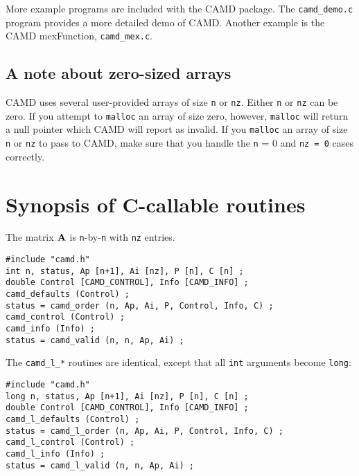 \documentclass[11pt]{article}
\newcommand{\m}[1]{{\bf{#1}}}       %
\begin{document}
More example programs are included with the CAMD package.
The {\tt camd\_demo.c} program provides a more detailed demo of CAMD.
Another example is the CAMD mexFunction, {\tt camd\_mex.c}.

\subsection{A note about zero-sized arrays}

CAMD uses several user-provided arrays of size {\tt n} or {\tt nz}.
Either {\tt n} or {\tt nz} can be zero.
If you attempt to {\tt malloc} an array of size zero,
however, {\tt malloc} will return a null pointer which CAMD will report
as invalid.  If you {\tt malloc} an array of
size {\tt n} or {\tt nz} to pass to CAMD, make sure that you handle the
{\tt n} = 0 and {\tt nz = 0} cases correctly.

\section{Synopsis of C-callable routines}
\label{Synopsis}

The matrix $\m{A}$ is {\tt n}-by-{\tt n} with {\tt nz} entries.

{\footnotesize
\begin{verbatim}
#include "camd.h"
int n, status, Ap [n+1], Ai [nz], P [n], C [n] ;
double Control [CAMD_CONTROL], Info [CAMD_INFO] ;
camd_defaults (Control) ;
status = camd_order (n, Ap, Ai, P, Control, Info, C) ;
camd_control (Control) ;
camd_info (Info) ;
status = camd_valid (n, n, Ap, Ai) ;
\end{verbatim}
}

The {\tt camd\_l\_*} routines are identical, except that all {\tt int}
arguments become {\tt long}:

{\footnotesize
\begin{verbatim}
#include "camd.h"
long n, status, Ap [n+1], Ai [nz], P [n], C [n] ;
double Control [CAMD_CONTROL], Info [CAMD_INFO] ;
camd_l_defaults (Control) ;
status = camd_l_order (n, Ap, Ai, P, Control, Info, C) ;
camd_l_control (Control) ;
camd_l_info (Info) ;
status = camd_l_valid (n, n, Ap, Ai) ;
\end{verbatim}
}
\end{document}

